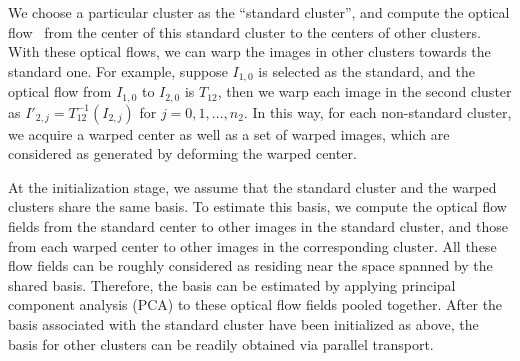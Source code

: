 We choose a particular cluster as the ``standard cluster'', and
compute the optical flow~\cite{OF} from the center of this standard cluster to
the centers of other clusters. With these optical flows, we can warp
the images in other clusters towards the standard one. For example,
suppose $I_{1,0}$ is selected as the standard, and the optical flow
from $I_{1,0}$ to $I_{2,0}$ is $T_{12}$, then we warp each image in
the second cluster as $I'_{2,j} = T_{12}^{-1}(I_{2,j})$ for $j = 0, 1,
\ldots, n_2$.
In this way, for each non-standard cluster, we acquire a warped center
as well as a set of warped images, which are considered as
generated by deforming the warped center.

At the initialization stage, we assume that the standard cluster and
the warped clusters share the same basis. To estimate this basis, we
compute the optical flow fields from the standard center to other
images in the standard cluster, and those from each warped center to
other images in the corresponding cluster. All these flow fields can
be roughly considered as residing near the space spanned by the shared
basis. Therefore, the basis can be estimated by applying principal
component analysis (PCA) to these optical flow fields pooled
together.
%
After the basis associated with the standard cluster have been
initialized as above, the basis for other clusters can be readily
obtained via parallel transport. 











